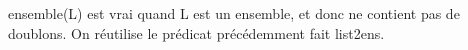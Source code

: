 \documentclass[a4paper, 11pt]{article}
\newenvironment{DDbox}[1]{
\begin{lrbox}{\BBbox}\begin{minipage}{\linewidth}}
{\end{minipage}\end{lrbox}\noindent\colorbox{Zgris}{\usebox{\BBbox}} \\
[.5cm]}
\begin{document}
ensemble(L) est vrai quand L est un ensemble, et donc ne contient
pas de doublons. On réutilise le prédicat précédemment fait
list2ens. \\
\begin{DDbox}{\linewidth}
    
\end{DDbox}

%     
\end{document}

